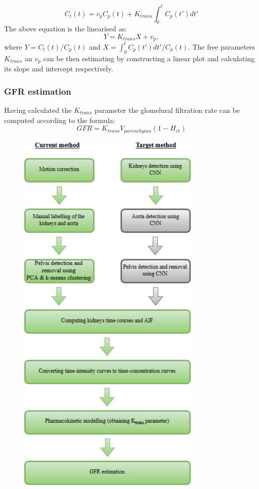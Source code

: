 \begin{equation}
	\label{eq:patlak}
	C_{t}(t) =v_pC_p(t) + K_{trans}\int_{0}^{t}C_p(t')dt'  
\end{equation}
The above equation is the linearised as:
\begin{equation}
	\label{eq:patlak_lin}
	Y = K_{trans}X +v_p,  
\end{equation}
where $Y=C_t(t)/C_p(t)$ and $X=\int_{0}^{t}C_p(t')dt'/C_p(t)$. The free parameters $K_{trans}$ an $v_p$ can be then estimating by constructing a linear plot and calculating its slope and intercept respectively.

\subsubsection{GFR estimation}
Having calculated the $K_{trans}$ parameter the glomelural filtration rate can be computed according to the formula:
\begin{equation}
	\label{eq:gfr}
	GFR = K_{trans}V_{parenchyma}(1-H_{ct}) 
\end{equation}

\begin{figure}
	\centering
	\includegraphics[height = 18cm]{img/methods}
	\caption{}
	\label{fig:methods}
\end{figure}